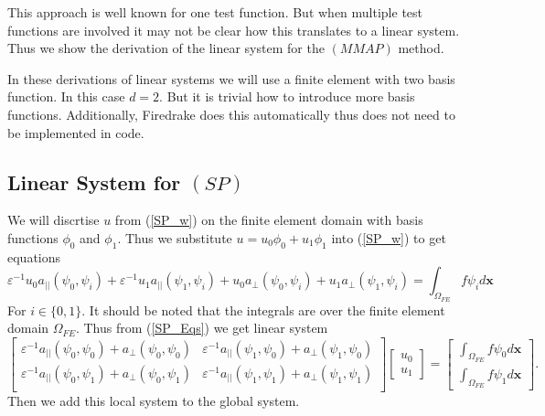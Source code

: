 \documentclass[12pt]{ociamthesis}
\begin{document}
This approach is well known for one test function. But when multiple test functions are involved it may not be clear how this translates to a linear system. Thus we show the derivation of the linear system for the $(MMAP)$ method.

In these derivations of linear systems we will use a finite element with two basis function. In this case $d=2$. But it is trivial how to introduce more basis functions. Additionally, Firedrake \cite{Dragon} does this automatically thus does not need to be implemented in code.
\subsection{Linear System for $(SP)$}
We will discrtise $u$ from (\ref{SP_w}) on the finite element domain with basis functions $\phi_0$ and $\phi_1$. Thus we substitute $u=u_0\phi_0 + u_1 \phi_1$ into (\ref{SP_w}) to get equations 
\begin{equation} \label{SP_Eqs}
\varepsilon^{-1}u_0a_{||}(\psi_0, \psi_i) +
\varepsilon^{-1}u_1a_{||}(\psi_1, \psi_i) +
u_0a_{\perp}(\psi_0, \psi_i) +
u_1a_{\perp}(\psi_1, \psi_i) =
\int_{\Omega_{FE}} f \psi_i d\mathbf{x}
\end{equation}
For $i \in \{0,1\}$. It should be noted that the integrals are over the finite element domain $\Omega_{FE}$. Thus from (\ref{SP_Eqs}) we get linear system
\begin{equation} 
\left[
\begin{matrix}
\varepsilon^{-1}a_{||}(\psi_0, \psi_0) + a_{\perp}(\psi_0,\psi_0) &
\varepsilon^{-1}a_{||}(\psi_1, \psi_0) + a_{\perp}(\psi_1,\psi_0)\\
\varepsilon^{-1}a_{||}(\psi_0, \psi_1) + a_{\perp}(\psi_0,\psi_1) &
\varepsilon^{-1}a_{||}(\psi_1, \psi_1) + a_{\perp}(\psi_1,\psi_1)\\
\end{matrix}
\right] 
\left [
\begin{matrix}
u_0 \\
u_1
\end{matrix}
\right ] =
\left[
\begin{matrix}
\int_{\Omega_{FE}} f \psi_0 d\mathbf{x} \\
\int_{\Omega_{FE}} f \psi_1 d\mathbf{x}
\end{matrix}
\right].
\end{equation}
Then we add this local system to the global system.
\end{document}
